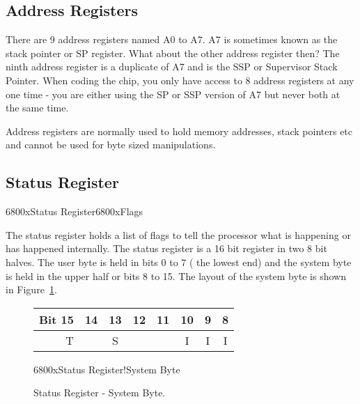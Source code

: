 \subsection{Address Registers}

There are 9 address registers named A0 to A7. A7 is sometimes
      known as the stack pointer or SP register. What about the other address
      register then? The ninth address register is a duplicate of A7 and is
      the SSP or Supervisor Stack Pointer. When coding the chip, you only have
      access to 8 address registers at any one time -{} you are either using the
      SP or SSP version of A7 but never both at the same time.

Address registers are normally used to hold memory addresses,
      stack pointers etc and cannot be used for byte sized
      manipulations.

\subsection{Status Register}\mc6800x{Status Register}\mc6800x{Flags}

The status register holds a list of flags to tell the processor
      what is happening or has happened internally. The status register is a
      16 bit register in two 8 bit halves. The user byte is held in bits 0 to
      7 ( the lowest end) and the system byte is held in the upper half or
      bits 8 to 15. The layout of the system byte is shown in Figure~\ref{fig:StatusRegisterSystemByte}.


\begin{figure}[h]
\centering
\begin{tabular}{|r|c|c|c|c|c|c|c|}
\hline
Bit 15 & 14 & 13 & 12  & 11 & 10 & 9 & 8 \\
\hline
T & & S & & & I & I & I \\
\hline
\end{tabular}

\caption{Status Register -{} System Byte.}\mc6800x{Status Register!System Byte}
\label{fig:StatusRegisterSystemByte}
\end{figure}

